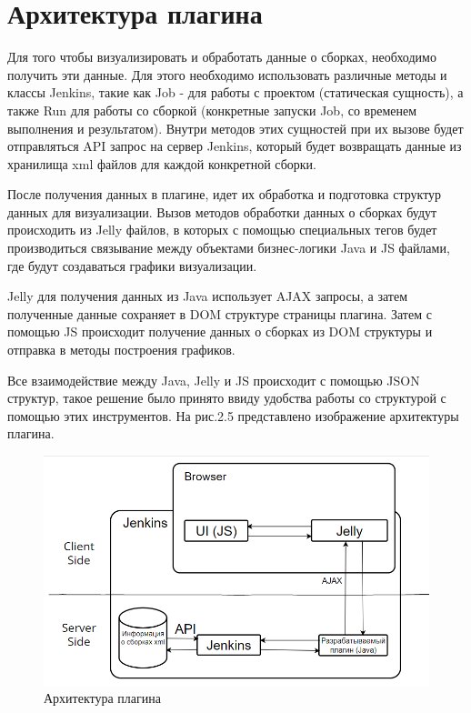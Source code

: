 \section{Архитектура плагина} \label{ch1:sec3}

Для того чтобы визуализировать и обработать данные о сборках, необходимо получить эти данные. Для этого необходимо использовать различные методы и классы Jenkins, такие как Job - для работы с проектом (статическая сущность), а также Run для работы со сборкой (конкретные запуски Job, со временем выполнения и результатом). Внутри методов этих сущностей при их вызове будет отправляться API запрос на сервер Jenkins, который будет возвращать данные из хранилища xml файлов для каждой конкретной сборки.

После получения данных в плагине, идет их обработка и подготовка структур данных для визуализации. Вызов методов обработки данных о сборках будут происходить из Jelly файлов, в которых с помощью специальных тегов будет производиться связывание между объектами бизнес-логики Java и JS файлами, где будут создаваться графики визуализации.

Jelly для получения данных из Java использует AJAX запросы, а затем полученные данные сохраняет в DOM структуре страницы плагина. Затем с помощью JS происходит получение данных о сборках из DOM структуры и отправка в методы построения графиков.

Все взаимодействие между Java, Jelly и JS происходит с помощью JSON структур, такое решение было принято ввиду удобства работы со структурой с помощью этих инструментов. На рис.2.5 представлено изображение архитектуры плагина.

\begin{figure}[ht!] 
	\center
	\includegraphics [scale=0.67] {my_folder/images//archpl3}
	\caption{Архитектура плагина} 
	\label{fig:ArchitecturePlugin}  
\end{figure}


